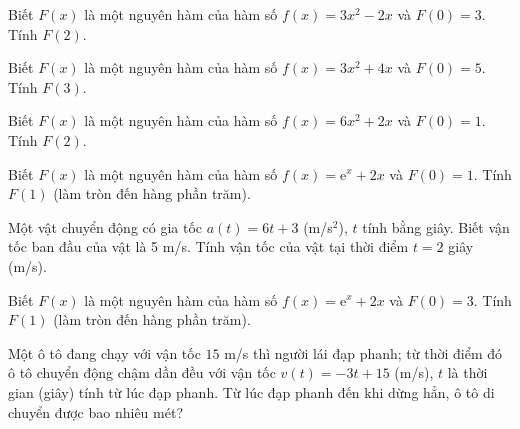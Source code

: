 \begin{bai}Biết $F(x)$ là một nguyên hàm của hàm số $f(x)=3 x^{2} - 2 x$ và $F(0)=3$. Tính $F(2)$.\otraloi{}\end{bai}
\begin{bai}Biết $F(x)$ là một nguyên hàm của hàm số $f(x)=3 x^{2} + 4 x$ và $F(0)=5$. Tính $F(3)$.\otraloi{}\end{bai}
\begin{bai}Biết $F(x)$ là một nguyên hàm của hàm số $f(x)=6 x^{2} + 2 x$ và $F(0)=1$. Tính $F(2)$.\otraloi{}\end{bai}
\begin{bai}Biết $F(x)$ là một nguyên hàm của hàm số $f(x)=\mathrm e^x+2x$ và $F(0)=1$. Tính $F(1)$ (làm tròn đến hàng phần trăm).\otraloi{}\end{bai}
\begin{bai}Một vật chuyển động có gia tốc $a(t)=6 t + 3$ (m/s$^2$), $t$ tính bằng giây. Biết vận tốc ban đầu của vật là 5 m/s. Tính vận tốc của vật tại thời điểm $t=2$ giây (m/s).\otraloi{}\end{bai}
\begin{bai}Biết $F(x)$ là một nguyên hàm của hàm số $f(x)=\mathrm e^x+2x$ và $F(0)=3$. Tính $F(1)$ (làm tròn đến hàng phần trăm).\otraloi{}\end{bai}
\begin{bai}Một ô tô đang chạy với vận tốc $15$ m/s thì người lái đạp phanh; từ thời điểm đó ô tô chuyển động chậm dần đều với vận tốc $v(t)=-3t+15$ (m/s), $t$ là thời gian (giây) tính từ lúc đạp phanh. Từ lúc đạp phanh đến khi dừng hẳn, ô tô di chuyển được bao nhiêu mét?
\otraloi
{}\end{bai}
